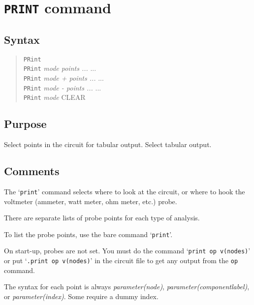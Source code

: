 \section{{\tt PRINT} command}
\subsection{Syntax}
\begin{verse}
{\tt PRint}\\
{\tt PRint} {\it mode points ...} ...\\
{\tt PRint} {\it mode + points ...} ...\\
{\tt PRint} {\it mode - points ...} ...\\
{\tt PRint} {\it mode} CLEAR
\end{verse}
\subsection{Purpose}

Select points in the circuit for tabular output.  Select tabular output.
\subsection{Comments}

The `{\tt print}' command selects where to look at the circuit, or where to
hook the voltmeter (ammeter, watt meter, ohm meter, etc.) probe.

There are separate lists of probe points for each type of analysis.

To list the probe points, use the bare command `{\tt print}'.

On start-up, probes are not set.  You must do the command `{\tt print op
v(nodes)}' or put `{\tt .print op v(nodes)}' in the circuit file to get any
output from the {\tt op} command.

The syntax for each point is always {\it parameter(node)}, {\it
parameter(componentlabel)}, or {\it parameter(index)}.  Some require a dummy
index.

